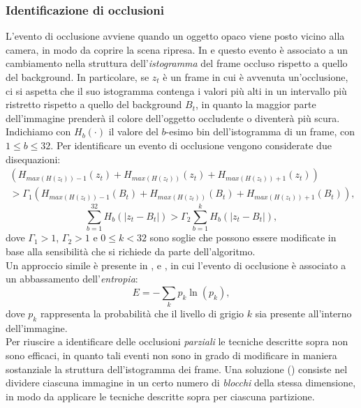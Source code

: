 \subsubsection{Identificazione di occlusioni}
L'evento di occlusione avviene quando un oggetto opaco viene posto vicino alla camera, in modo da coprire la scena ripresa.
In \cite{aksay2007camera} e \cite{saglam2009real} questo evento \`e associato a un cambiamento nella struttura dell'\textit{istogramma} del frame occluso rispetto a quello del background.
In particolare, se $z_t$ \`e un frame in cui \`e avvenuta un'occlusione, ci si aspetta che il suo istogramma contenga i valori pi\`u alti in un intervallo pi\`u ristretto rispetto a quello del background $B_t$, in quanto la maggior parte dell'immagine prender\`a il colore dell'oggetto occludente o diventer\`a pi\`u scura.\\
Indichiamo con $H_b(\cdot)$ il valore del $b$-esimo bin dell'istogramma di un frame, con $1 \leq b \leq 32$.
Per identificare un evento di occlusione vengono considerate due disequazioni:
\begin{eqnarray}
 \left(H_{max\left(H(z_t)\right)-1}(z_t) + H_{max\left(H(z_t)\right)}(z_t) +  H_{max\left(H(z_t)\right) + 1}(z_t)\right) \nonumber \\
 > \Gamma_1 \left(H_{max\left(H(z_t)\right)-1}(B_t) + H_{max\left(H(z_t)\right)}(B_t)
  +  H_{max\left(H(z_t)\right) + 1}(B_t)\right), \nonumber
\end{eqnarray}
\[ \sum_{b=1}^{32} H_b\left(|z_t - B_t|\right) > \Gamma_2 \sum_{b=1}^{k}H_b\left(|z_t - B_t|\right),\]
dove $\Gamma_1 > 1$, $\Gamma_2 > 1$ e $0 \leq k < 32$ sono soglie che possono essere modificate in base alla sensibilit\`a che si richiede da parte dell'algoritmo.\\
Un approccio simile \`e presente in \cite{harasse2004automated}, \cite{gil2007automatic} e \cite{ellwart2012camera}, in cui l'evento di occlusione \`e associato a un abbassamento dell'\textit{entropia}:
 \[
 \label{eq:entropy}
 E=-\sum_{k}p_k\ln(p_k) ,
 \]
 dove $p_k$ rappresenta la probabilit\`a che il livello di grigio $k$ sia presente all'interno dell'immagine. \\
 Per riuscire a identificare delle occlusioni \textit{parziali} le tecniche descritte sopra non sono efficaci, in quanto tali eventi non sono in grado di modificare in maniera sostanziale la struttura dell'istogramma dei frame.
 Una soluzione (\cite{gil2007automatic}) consiste nel dividere ciascuna immagine in un certo numero di \textit{blocchi} della stessa dimensione, in modo da applicare le tecniche descritte sopra per ciascuna partizione.
